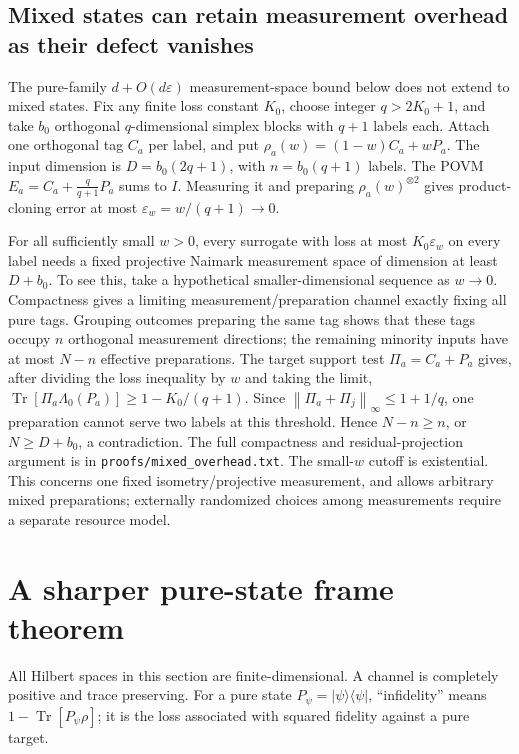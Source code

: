 \documentclass[11pt]{article}
\newcommand{\Tr}{\operatorname{Tr}}
\newcommand{\norm}[1]{\left\lVert#1\right\rVert}
\begin{document}
\subsection{Mixed states can retain measurement overhead as their defect vanishes}

The pure-family $d+O(d\varepsilon)$ measurement-space bound below does not extend to mixed states. Fix any finite loss constant $K_0$, choose integer $q>2K_0+1$, and take $b_0$ orthogonal $q$-dimensional simplex blocks with $q+1$ labels each. Attach one orthogonal tag $C_a$ per label, and put $\rho_a(w)=(1-w)C_a+wP_a$. The input dimension is $D=b_0(2q+1)$, with $n=b_0(q+1)$ labels. The POVM $E_a=C_a+\frac q{q+1}P_a$ sums to $I$. Measuring it and preparing $\rho_a(w)^{\otimes2}$ gives product-cloning error at most $\varepsilon_w=w/(q+1)\to0$.

For all sufficiently small $w>0$, every surrogate with loss at most $K_0\varepsilon_w$ on every label needs a fixed projective Naimark measurement space of dimension at least $D+b_0$. To see this, take a hypothetical smaller-dimensional sequence as $w\to0$. Compactness gives a limiting measurement/preparation channel exactly fixing all pure tags. Grouping outcomes preparing the same tag shows that these tags occupy $n$ orthogonal measurement directions; the remaining minority inputs have at most $N-n$ effective preparations. The target support test $\Pi_a=C_a+P_a$ gives, after dividing the loss inequality by $w$ and taking the limit,
$\Tr[\Pi_a\Lambda_0(P_a)]\ge1-K_0/(q+1)$. Since $\norm{\Pi_a+\Pi_j}_\infty\le1+1/q$, one preparation cannot serve two labels at this threshold. Hence $N-n\ge n$, or $N\ge D+b_0$, a contradiction. The full compactness and residual-projection argument is in \texttt{proofs/mixed\_overhead.txt}. The small-$w$ cutoff is existential. This concerns one fixed isometry/projective measurement, and allows arbitrary mixed preparations; externally randomized choices among measurements require a separate resource model.

\section{A sharper pure-state frame theorem}\label{sec:clone}

All Hilbert spaces in this section are finite-dimensional. A channel is completely positive and trace preserving. For a pure state $P_\psi=|\psi\rangle\langle\psi|$, ``infidelity'' means $1-\Tr[P_\psi\rho]$; it is the loss associated with squared fidelity against a pure target.
\end{document}
